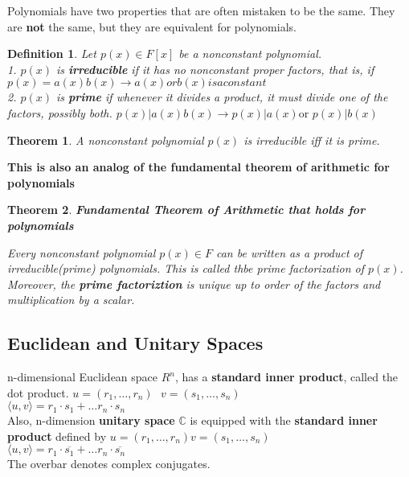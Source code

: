 \documentclass [12pt]{article}
\newtheorem {theorem}{Theorem}
\newtheorem {definition}{Definition}
\begin{document}
Polynomials have two properties that are often mistaken to be the same.
They are \textbf{not} the same, but they are equivalent for polynomials.
\begin {definition}
 Let $p(x)\in F[x]$ be a nonconstant polynomial.\\
1. $p(x)$ is \textbf{irreducible} if it has no nonconstant proper factors,
that is, if \\
\(p(x)=a(x)b(x)\rightarrow a(x)orb(x)isaconstant\)\\

2. $p(x)$ is \textbf{prime} if whenever it divides a product, it must divide
one of the factors, possibly both. \(p(x)|a(x)b(x)\rightarrow p(x)|a(x){\text {
or }}p(x)|b(x)\) 
\end {definition}
 

\begin {theorem}
 A nonconstant polynomial $p(x)$ is irreducible iff it is prime. 
\end {theorem}
 

\textbf{This is also an analog of the fundamental theorem of arithmetic
for polynomials} 

\begin {theorem}
 \textbf{Fundamental Theorem of Arithmetic that holds for polynomials} 

Every nonconstant polynomial $p(x)\in F$ can be written as a product of
irreducible(prime) polynomials. This is called thbe prime factorization
of $p(x)$. Moreover, the \textbf{prime factoriztion} is unique up to order
of the factors and multiplication by a scalar. 
\end {theorem}
 


\subsection {Euclidean and Unitary Spaces} n-dimensional Euclidean space
$R^{n}$, has a \textbf{standard inner product}, called the dot product.
\(u=(r_1,\ldots ,r_n){\text { }}v=(s_1,\ldots ,s_n)\)\\
\(\langle u,v\rangle =r_1\cdot s_1+\ldots r_n\cdot s_n\)\\

Also, n-dimension \textbf{unitary space} ${\mathbb{C}}$ is equipped with
the \textbf{standard inner product} defined by \(u=(r_1,\ldots ,r_n){\text {
}}v=(s_1,\ldots ,s_n)\)\\
\(\langle u,v\rangle =r_1\cdot \overline {s_1}+\ldots r_n\cdot \overline {s_n}\)\\
The overbar denotes complex conjugates. 
\end{document}
